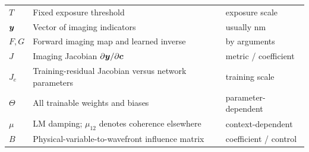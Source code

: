 \begin{longtable}{@{}L{.22\textwidth}L{.53\textwidth}L{.16\textwidth}@{}}
$T$ &Fixed exposure threshold &exposure scale\\
$\bm{y}$ &Vector of imaging indicators &usually nm\\
$F,G$ &Forward imaging map and learned inverse &by arguments\\
$J$ &Imaging Jacobian $\partial\bm{y}/\partial\bm{c}$
&metric / coefficient\\
$J_e$ &Training-residual Jacobian versus network parameters &training scale\\
$\Theta$ &All trainable weights and biases &parameter-dependent\\
$\mu$ &LM damping; $\mu_{12}$ denotes coherence elsewhere &context-dependent\\
$B$ &Physical-variable-to-wavefront influence matrix &coefficient / control\\
\bottomrule
\end{longtable}

